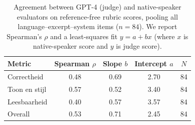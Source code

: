 \begin{table}[htbp]
\centering
\scriptsize
\renewcommand{\arraystretch}{1.15}
\setlength{\tabcolsep}{6pt}
\caption{Agreement between GPT-4 (judge) and native-speaker evaluators on reference-free rubric scores, pooling all language--excerpt--system items ($n=84$). We report Spearman's $\rho$ and a least-squares fit $y = a + b x$ (where $x$ is native-speaker score and $y$ is judge score).}
\label{tab:ref-free-judge-human-agreement}
\begin{tabular}{@{}l c c c c@{}}
\toprule
Metric & Spearman $\rho$ & Slope $b$ & Intercept $a$ & $N$ \\
\midrule
Correctheid & 0.48 & 0.69 & 2.70 & 84 \\
Toon en stijl & 0.57 & 0.52 & 3.40 & 84 \\
Leesbaarheid & 0.40 & 0.57 & 3.57 & 84 \\
Overall & 0.53 & 0.71 & 2.45 & 84 \\
\bottomrule
\end{tabular}
\end{table}
